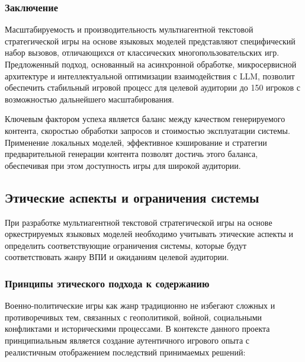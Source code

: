 \subsubsection{Заключение}

Масштабируемость и производительность мультиагентной текстовой стратегической игры на основе языковых моделей представляют специфический набор вызовов, отличающихся от классических многопользовательских игр. Предложенный подход, основанный на асинхронной обработке, микросервисной архитектуре и интеллектуальной оптимизации взаимодействия с LLM, позволит обеспечить стабильный игровой процесс для целевой аудитории до 150 игроков с возможностью дальнейшего масштабирования.

Ключевым фактором успеха является баланс между качеством генерируемого контента, скоростью обработки запросов и стоимостью эксплуатации системы. Применение локальных моделей, эффективное кэширование и стратегии предварительной генерации контента позволят достичь этого баланса, обеспечивая при этом доступность игры для широкой аудитории.

\subsection{Этические аспекты и ограничения системы}

При разработке мультиагентной текстовой стратегической игры на основе оркестрируемых языковых моделей необходимо учитывать этические аспекты и определить соответствующие ограничения системы, которые будут соответствовать жанру ВПИ и ожиданиям целевой аудитории.

\subsubsection{Принципы этического подхода к содержанию}

Военно-политические игры как жанр традиционно не избегают сложных и противоречивых тем, связанных с геополитикой, войной, социальными конфликтами и историческими процессами. В контексте данного проекта принципиальным является создание аутентичного игрового опыта с реалистичным отображением последствий принимаемых решений:

